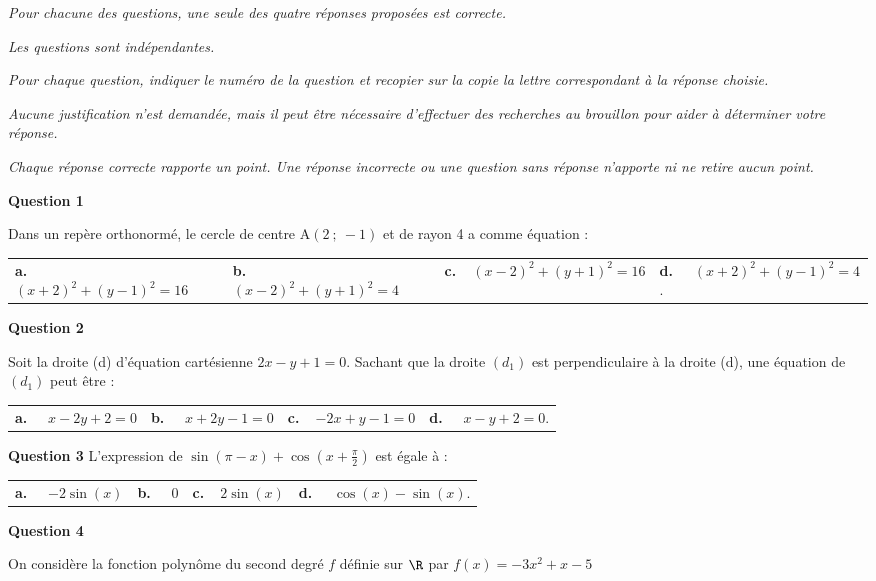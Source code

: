 \medskip


\emph{Pour chacune des questions, une seule des quatre réponses proposées est correcte.}

\emph{Les questions sont indépendantes.}

\emph{Pour chaque question, indiquer le numéro de la question et recopier sur la copie la lettre correspondant à la réponse choisie.}

\emph{Aucune justification n'est demandée, mais il peut être nécessaire d'effectuer des recherches au brouillon pour aider à déterminer votre réponse.}

\emph{Chaque réponse correcte rapporte un point. Une réponse incorrecte ou une question sans réponse n'apporte ni ne retire aucun point.}

\medskip

\textbf{Question 1}

\medskip 

Dans un repère orthonormé, le cercle de centre A$(2~;~-1)$ et de rayon 4 a comme équation :

\medskip

\begin{tabularx}{\linewidth}{*{4}{X}}
\textbf{a.~~} $(x+2)^2+(y-1)^2=16$ &\textbf{b.~~} $(x-2)^2+(y+1)^2=4$&\textbf{c.~~}$(x-2)^2+(y+1)^2=16$& \textbf{d.~~} $(x+2)^2+(y-1)^2=4$.
\end{tabularx}

\medskip
\textbf{Question 2}
\medskip 

Soit la droite (d) d'équation cartésienne $2x-y+1 = 0$.
Sachant que la droite $(d_1)$ est perpendiculaire à la droite (d), une équation de $(d_1)$
 peut être :

\begin{tabularx}{\linewidth}{*{4}{X}}
\textbf{a.~~} $x-2y+2 = 0$ &\textbf{b.~~} $x+2y-1 = 0$&\textbf{c.~~}$-2x+y-1 = 0$& \textbf{d.~~} $x-y+2 = 0$.
\end{tabularx}

\medskip
\textbf{Question 3}
\medskip 
L'expression de $\sin(\pi- x)+\cos \left(x+ \frac{\pi}{2}\right)$ est égale à :


\begin{tabularx}{\linewidth}{*{4}{X}}
\textbf{a.~~} $-2\sin(x)$ &\textbf{b.~~} $0$&\textbf{c.~~}$2\sin(x)$& \textbf{d.~~} $\cos(x)-\sin (x)$.
\end{tabularx}

\medskip
\textbf{Question 4}
\medskip 

On considère la fonction polynôme du second degré $f$ définie sur $\R$ par $f(x)= -3x^2+x-5$

